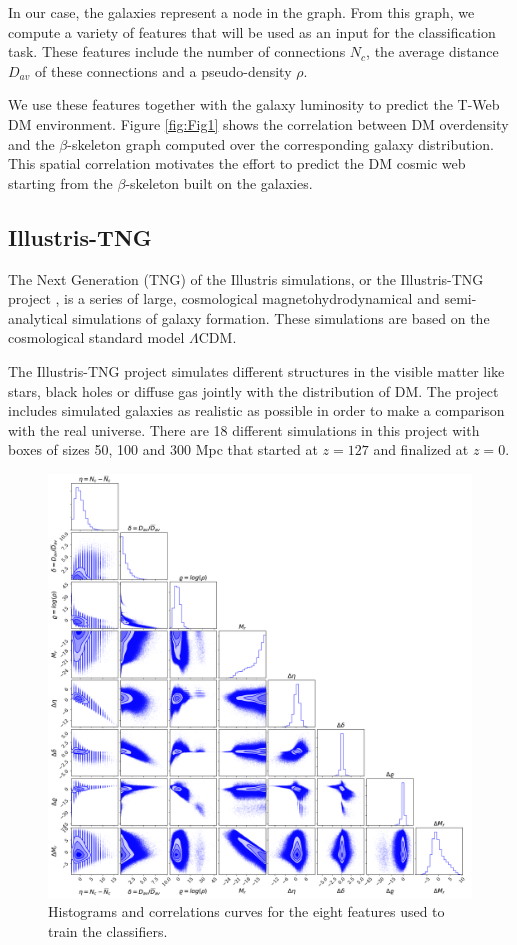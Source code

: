 \documentclass[usenatbib]{mnras}
\begin{document}
In our case, the galaxies represent a node in the graph.
From this graph, we compute a variety of features that will be used as an input
for the classification task.
These features include the number of connections $N_{c}$, the average distance $D_{av}$ of these connections and a pseudo-density $\rho$.

We use these features together with the galaxy luminosity to predict the T-Web DM environment.
Figure \ref{fig:Fig1} shows the correlation between DM overdensity and the $\beta$-skeleton 
graph computed over the corresponding galaxy distribution.
This spatial correlation motivates the effort to predict the DM cosmic web starting from
the $\beta$-skeleton built on the galaxies.

\subsection{Illustris-TNG}

The Next Generation (TNG) of the Illustris simulations, or the Illustris-TNG project \citep{Nelson2015}, 
is a series of large, cosmological magnetohydrodynamical and semi-analytical simulations of
galaxy formation. These simulations are based on the cosmological standard model $\Lambda$CDM.

The Illustris-TNG project simulates different structures in the visible matter like stars, black
holes or diffuse gas jointly with the distribution of DM. 
The project includes simulated galaxies as realistic as possible in order to make a comparison
with the real universe.
There are 18 different simulations in this project with boxes of sizes 50, 100 and 300 Mpc
that started at  $z=127$ and finalized at $z=0$. 

\begin{figure}
        \includegraphics[scale=0.4]{Figs/p_all_features_correlations.pdf}
    \caption{Histograms and correlations curves for the eight features used to train the classifiers.}
    \label{fig:features}
\end{figure}
\end{document}
